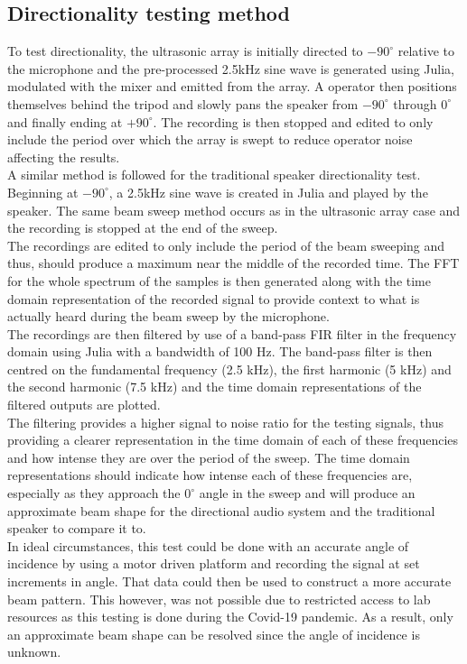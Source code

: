 \subsection{Directionality testing method}
To test directionality, the ultrasonic array is initially directed to $-90^\circ$ relative to the microphone and the pre-processed 2.5kHz sine wave is generated using Julia, modulated with the mixer and emitted from the array. A operator then positions themselves behind the tripod and slowly pans the speaker from $-90^\circ$ through $0^\circ$ and finally ending at $+90^\circ$. The recording is then stopped and edited to only include the period over which the array is swept to reduce operator noise affecting the results.\\
A similar method is followed for the traditional speaker directionality test. Beginning at $-90^\circ$, a 2.5kHz sine wave is created in Julia and played by the speaker. The same beam sweep method occurs as in the ultrasonic array case and the recording is stopped at the end of the sweep.\\
The recordings are edited to only include the period of the beam sweeping and thus, should produce a maximum near the middle of the recorded time. The FFT for the whole spectrum of the samples is then generated along with the time domain representation of the recorded signal to provide context to what is actually heard during the beam sweep by the microphone.\\
The recordings are then filtered by use of a band-pass FIR filter in the frequency domain using Julia with a bandwidth of 100 Hz. The band-pass filter is then centred on the fundamental frequency (2.5 kHz), the first harmonic (5 kHz) and the second harmonic (7.5 kHz) and the time domain representations of the filtered outputs are plotted.\\
The filtering provides a higher signal to noise ratio for the testing signals, thus providing a clearer representation in the time domain of each of these frequencies and how intense they are over the period of the sweep. The time domain representations should indicate how intense each of these frequencies are, especially as they approach the $0^\circ$ angle in the sweep and will produce an approximate beam shape for the directional audio system and the traditional speaker to compare it to.\\
In ideal circumstances, this test could be done with an accurate angle of incidence by using a motor driven platform and recording the signal at set increments in angle. That data could then be used to construct a more accurate beam pattern. This however, was not possible due to restricted access to lab resources as this testing is done during the Covid-19 pandemic. As a result, only an approximate beam shape can be resolved since the angle of incidence is unknown.

